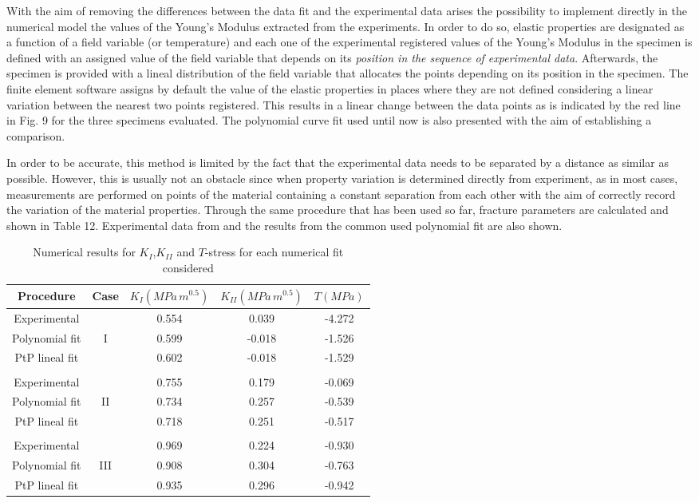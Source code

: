With the aim of removing the differences between the data fit and the experimental data arises the possibility to implement directly in the numerical model the values of the Young's Modulus extracted from the experiments. In order to do so, elastic properties are designated as a function of a field variable (or temperature) and each one of the experimental registered values of the Young's Modulus in the specimen is defined with an assigned value of the field variable that depends on its \textit{position in the sequence of experimental data}. Afterwards, the specimen is provided with a lineal distribution of the field variable that allocates the points depending on its position in the specimen. The finite element software assigns by default the value of the elastic properties in places where they are not defined considering a linear variation between the nearest two points registered. This results in a linear change between the data points as is indicated by the red line in Fig. 9 for the three specimens evaluated. The polynomial curve fit used until now is also presented with the aim of establishing a comparison.

In order to be accurate, this method is limited by the fact that the experimental data needs to be separated by a distance as similar as possible. However, this is usually not an obstacle since when property variation is determined directly from experiment, as in most cases, measurements are performed on points of the material containing a constant separation from each other with the aim of correctly record the variation of the material properties. Through the same procedure that has been used so far, fracture parameters are calculated and shown in Table 12. Experimental data from \cite{Abanto-Bueno2006} and the results from the common used polynomial fit are also shown.

\begin{table*}[htbp]
\caption{Numerical results for $K_I$,$K_{II}$ and $T$-stress for each numerical fit considered}
\centering
\begin{tabular}{c c c c c} 
\hline \hline
Procedure & Case & $K_I (M\!Pa\,m^{0.5})$ & $K_{II} (M\!Pa\,m^{0.5})$ & $T (M\!Pa)$ \\
 \hline
 Experimental & & 0.554 & 0.039 & -4.272 \\
 Polynomial fit & I & 0.599 & -0.018 & -1.526\\
 PtP lineal fit & & 0.602 & -0.018 & -1.529\\
 \\
 Experimental & & 0.755 & 0.179 & -0.069 \\
 Polynomial fit & II & 0.734 & 0.257 & -0.539 \\
 PtP lineal fit & & 0.718 & 0.251 & -0.517\\
 \\
 Experimental & & 0.969 & 0.224 & -0.930 \\
 Polynomial fit & III & 0.908 & 0.304 & -0.763\\
 PtP lineal fit & & 0.935 & 0.296 & -0.942\\
 \hline \hline 
\end{tabular}
\label{tab:Table12}
\end{table*}

